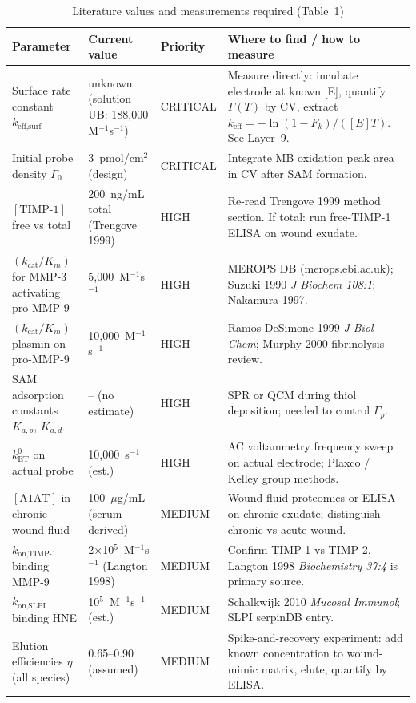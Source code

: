 \documentclass[10pt,a4paper]{article}
\begin{document}
\begin{table}[H]
\caption{Literature values and measurements required (Table~1)}
{\small
\begin{tabularx}{\linewidth}{p{3.6cm}p{2.8cm}p{1.4cm}p{6.0cm}}
\toprule
Parameter & Current value & Priority & Where to find / how to measure \\
\midrule
Surface rate constant $k_\text{eff,surf}$ & unknown (solution UB: 188,000 M$^{-1}$s$^{-1}$) & CRITICAL & Measure directly: incubate electrode at known [E], quantify $\Gamma(T)$ by CV, extract $k_\text{eff} = -\ln(1-F_k)/([E]T)$. See Layer~9. \\
Initial probe density $\Gamma_0$ & 3~pmol/cm$^2$ (design) & CRITICAL & Integrate MB oxidation peak area in CV after SAM formation. \\
$[\text{TIMP-1}]$ free vs total & 200~ng/mL total (Trengove 1999) & HIGH & Re-read Trengove 1999 method section. If total: run free-TIMP-1 ELISA on wound exudate. \\
$(k_\text{cat}/K_m)$ for MMP-3 activating pro-MMP-9 & 5,000~M$^{-1}$s$^{-1}$ & HIGH & MEROPS DB (merops.ebi.ac.uk); Suzuki 1990 \textit{J Biochem 108:1}; Nakamura 1997. \\
$(k_\text{cat}/K_m)$ plasmin on pro-MMP-9 & 10,000~M$^{-1}$s$^{-1}$ & HIGH & Ramos-DeSimone 1999 \textit{J Biol Chem}; Murphy 2000 fibrinolysis review. \\
SAM adsorption constants $K_{a,p}$, $K_{a,d}$ & -- (no estimate) & HIGH & SPR or QCM during thiol deposition; needed to control $\Gamma_p$. \\
$k_\text{ET}^0$ on actual probe & 10,000~s$^{-1}$ (est.) & HIGH & AC voltammetry frequency sweep on actual electrode; Plaxco / Kelley group methods. \\
$[\text{A1AT}]$ in chronic wound fluid & 100~$\mu$g/mL (serum-derived) & MEDIUM & Wound-fluid proteomics or ELISA on chronic exudate; distinguish chronic vs acute wound. \\
$k_\text{on,TIMP-1}$ binding MMP-9 & 2$\times$10$^5$~M$^{-1}$s$^{-1}$ (Langton 1998) & MEDIUM & Confirm TIMP-1 vs TIMP-2. Langton 1998 \textit{Biochemistry 37:4} is primary source. \\
$k_\text{on,SLPI}$ binding HNE & 10$^5$~M$^{-1}$s$^{-1}$ (est.) & MEDIUM & Schalkwijk 2010 \textit{Mucosal Immunol}; SLPI serpinDB entry. \\
Elution efficiencies $\eta$ (all species) & 0.65--0.90 (assumed) & MEDIUM & Spike-and-recovery experiment: add known concentration to wound-mimic matrix, elute, quantify by ELISA. \\

\end{tabularx}}
\end{table}
\end{document}
